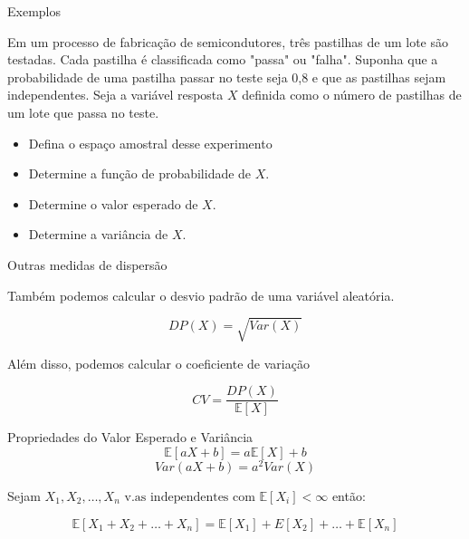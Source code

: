 \begin{frame}{Exemplos}
    \begin{exemplo}[11]
     Em um processo de fabricação de semicondutores, três pastilhas de um lote são testadas. Cada pastilha é classificada como "passa" ou "falha". Suponha que a probabilidade de uma pastilha passar no teste seja 0,8 e que as pastilhas sejam independentes. Seja a variável resposta $X$ definida como o número de pastilhas de um lote que passa no teste. 

     \begin{itemize}
         \item Defina o espaço amostral desse experimento
         \item Determine a função de probabilidade de $X$.
         \item Determine o valor esperado de $X$.
         \item Determine a variância de $X$.
     \end{itemize}
     
\end{exemplo}
\end{frame}


\begin{frame}{Outras medidas de dispersão}

Também podemos calcular o desvio padrão de uma variável aleatória. 

$$DP(X) = \sqrt{Var(X)}$$

Além disso, podemos calcular o coeficiente de variação

$$CV = \dfrac{DP(X)}{\mathbb{E}[X]}$$
\end{frame}

\begin{frame}{Propriedades do Valor Esperado e Variância}
    $$\mathbb{E}[aX +b] = a\mathbb{E}[X] + b$$
    $$Var(aX +b) = a^2Var(X)$$

    Sejam $X_1, X_2, \dots, X_n \text{ v.as independentes com } \mathbb{E}[X_i]<\infty$ então:

$$\mathbb{E}[X_1 + X_2 + \dots + X_n] = \mathbb{E}[X_1] + E[X_2] + \dots + \mathbb{E}[X_n]$$
\end{frame}

